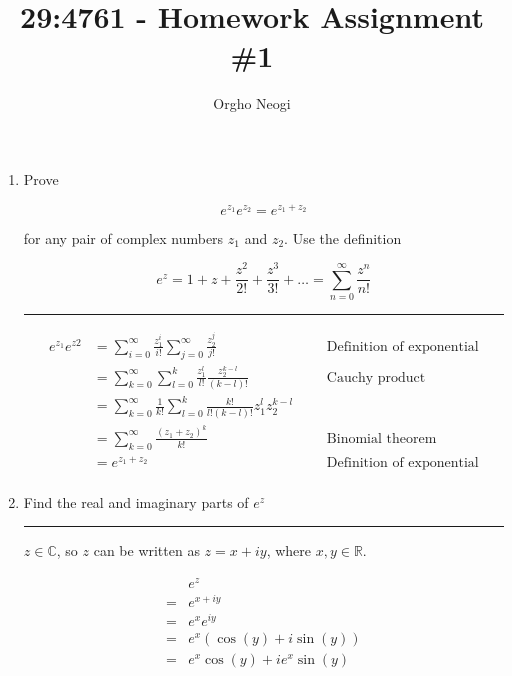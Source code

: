 \documentclass[12pt, oneside]{article}
\title{29:4761 - Homework Assignment \#1}
\author{Orgho Neogi}
\date{}
\newenvironment{answer}
  {\vspace*{0.2cm} \rule{12cm}{0.02cm} \vspace*{0.2cm}}
  {\vspace*{0.2cm}}
\begin{document}
\maketitle

\begin{enumerate}
  \item Prove

  \begin{equation*}
    e^{z_1}e^{z_2} = e^{z_1 + z_2}
  \end{equation*}

  for any pair of complex numbers $z_1$ and $z_2$. Use the definition

  \begin{equation*}
    e^z = 1 + z + \frac{z^2}{2!} + \frac{z^3}{3!} + \dots = \sum_{n=0}^{\infty} \frac{z^n}{n!}
  \end{equation*}

    \begin{answer}
      \begin{align*}
        e^{z_1}e^{z2} &= \sum_{i=0}^{\infty} \frac{z_1^i}{i!} \sum_{j=0}^{\infty} \frac{z_2^j}{j!} &&& \text{Definition of exponential} \\
         &= \sum_{k=0}^{\infty}\sum_{l=0}^{k} \frac{z_1^l}{l!}\frac{z_2^{k-l}}{(k-l)!} &&& \text{Cauchy product}\\
         &= \sum_{k=0}^{\infty} \frac{1}{k!} \sum_{l=0}^{k} \frac{k!}{l!(k-l)!}z_1^lz_2^{k-l} \\
         &= \sum_{k=0}^{\infty} \frac{(z_1 + z_2)^k}{k!} &&& \text{Binomial theorem} \\
         &= e^{z_1 + z_2} &&& \text{Definition of exponential} \\
      \end{align*}
    \end{answer}

  \item Find the real and imaginary parts of $e^z$

    \begin{answer}

      $z \in \mathbb{C}$, so $z$ can be written as $z = x + iy$, where $x, y \in \mathbb{R}$.

      \begin{align*}
        &e^z \\
        = &e^{x + iy} \\
        = &e^{x}e^{iy} \\
        = &e^{x}(\cos(y) + i\sin(y)) \\
        = &e^{x}\cos(y) + ie^{x}\sin(y)
      \end{align*}


\end{answer}
\end{enumerate}
\end{document}
